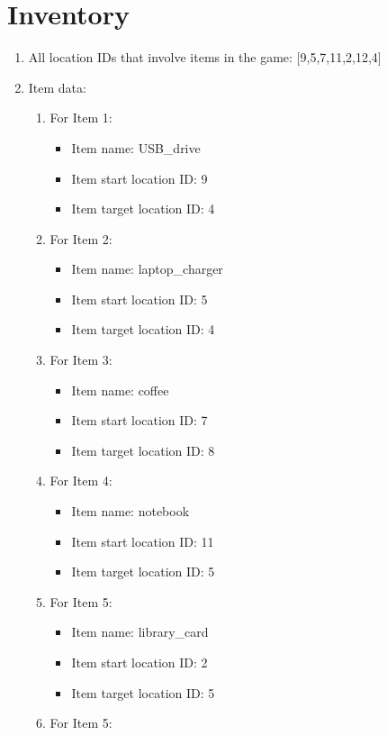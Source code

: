 \documentclass[11pt]{article}
\begin{document}
\section*{Inventory}

\begin{enumerate}
\item All location IDs that involve items in the game:
[9,5,7,11,2,12,4]
\item Item data:
\begin{enumerate}
    \item For Item 1:
    \begin{itemize}
    \item Item name: USB\_drive
    \item Item start location ID: 9
    \item Item target location ID: 4
    \end{itemize}
        \item For Item 2:
    \begin{itemize}
    \item Item name: laptop\_charger
    \item Item start location ID: 5
    \item Item target location ID: 4
    \end{itemize}
        \item For Item 3:
    \begin{itemize}
    \item Item name: coffee
    \item Item start location ID: 7
    \item Item target location ID: 8
    \end{itemize}
        \item For Item 4:
    \begin{itemize}
    \item Item name: notebook
    \item Item start location ID: 11
    \item Item target location ID: 5
    \end{itemize}
        \item For Item 5:
    \begin{itemize}
    \item Item name: library\_card
    \item Item start location ID: 2
    \item Item target location ID: 5
    \end{itemize}
            \item For Item 5:

\end{enumerate}
\end{enumerate}
\end{document}
